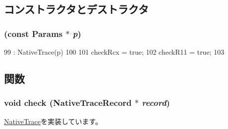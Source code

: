 \subsection{コンストラクタとデストラクタ}
\hypertarget{classTrace_1_1X86NativeTrace_af861ba55625d4733915ac926900e6944}{
\subsubsection[{X86NativeTrace}]{ (const {\bf Params} $\ast$ {\em p})}}
\label{classTrace_1_1X86NativeTrace_af861ba55625d4733915ac926900e6944}



\begin{DoxyCode}
99     : NativeTrace(p)
100 {
101     checkRcx = true;
102     checkR11 = true;
103 }
\end{DoxyCode}


\subsection{関数}
\hypertarget{classTrace_1_1X86NativeTrace_a826e1279dfa7dd9ce6760a2e6efe4116}{
\subsubsection[{check}]{\setlength{\rightskip}{0pt plus 5cm}void check ({\bf NativeTraceRecord} $\ast$ {\em record})}}
\label{classTrace_1_1X86NativeTrace_a826e1279dfa7dd9ce6760a2e6efe4116}


\hyperlink{classTrace_1_1NativeTrace_adb484644aa43b4370d31b6a7286b0dd1}{NativeTrace}を実装しています。


